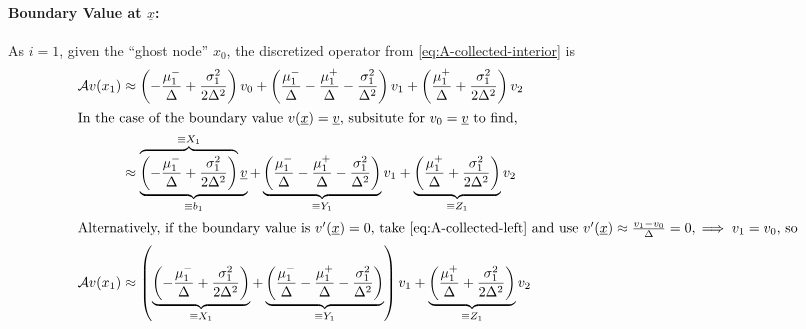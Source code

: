 \documentclass[11pt]{etk-article}
\begin{document}
\paragraph{Boundary Value at $\underline{x}$:}
As $i =1$, given the ``ghost node'' $x_0$, the discretized operator from \cref{eq:A-collected-interior} is
\begin{align}
\mathcal{A} v(x_1) &\approx \left(-\frac{\mu_1^{-}}{\Delta} +\frac{\sigma_1^2}{2\Delta^2}\right)v_0 + \left(\frac{\mu_1^{-}}{\Delta} - \frac{\mu_1^{+}}{\Delta}-\frac{\sigma_1^2}{\Delta^2}\right)v_1 + \left(\frac{\mu_1^{+}}{\Delta} + \frac{\sigma_1^2}{2\Delta^2}\right)v_2\label{eq:A-collected-left}\\
\intertext{In the case of the boundary value $v(\underline{x}) = \underline{v}$, subsitute for $v_0 =  \underline{v}$ to find,}
&\approx \underbrace{\overbrace{\left(-\frac{\mu_1^{-}}{\Delta} +\frac{\sigma_1^2}{2\Delta^2}\right)}^{\equiv X_1}\underline{v}}_{\equiv b_1} +  \underbrace{\left(\frac{\mu_1^{-}}{\Delta} - \frac{\mu_1^{+}}{\Delta}-\frac{\sigma_1^2}{\Delta^2}\right)}_{\equiv Y_1}v_1 + \underbrace{\left(\frac{\mu_1^{+}}{\Delta} + \frac{\sigma_1^2}{2\Delta^2}\right)}_{\equiv Z_1}v_2\\
\intertext{Alternatively, if the boundary value is $v'(\underline{x}) = 0$, take \cref{eq:A-collected-left} and use $v'(\underline{x}) \approx \frac{v_1-v_0}{\Delta} = 0, \implies v_1 = v_0$, so}
\mathcal{A} v(x_1) &\approx \left(\underbrace{\left(-\frac{\mu_1^{-}}{\Delta} +\frac{\sigma_1^2}{2\Delta^2}\right)}_{\equiv X_1} + \underbrace{\left(\frac{\mu_1^{-}}{\Delta} - \frac{\mu_1^{+}}{\Delta}-\frac{\sigma_1^2}{\Delta^2}\right)}_{\equiv Y_1}\right)v_1 + \underbrace{\left(\frac{\mu_1^{+}}{\Delta} + \frac{\sigma_1^2}{2\Delta^2}\right)}_{\equiv Z_1}v_2
\end{align}
\end{document}
